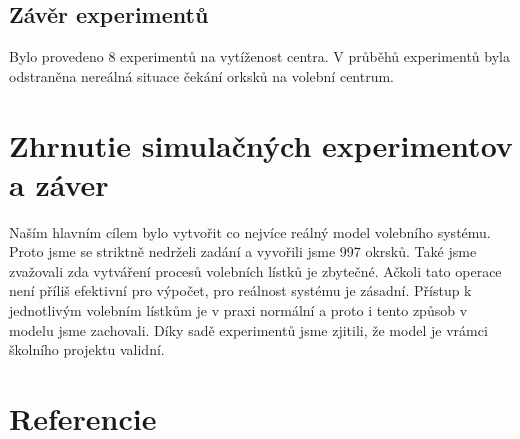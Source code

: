 \documentclass[12pt,a4paper,titlepage,final]{article}
\begin{document}
\newline
\newline
\newpage
\subsection{Závěr experimentů}
Bylo provedeno 8 experimentů na vytíženost centra. V průběhů experimentů byla odstraněna nereálná situace čekání orksků na volební centrum.


\section{Zhrnutie simulačných experimentov a záver}
Naším hlavním cílem bylo vytvořit co nejvíce reálný model volebního systému. Proto jsme se striktně nedrželi zadání a vyvořili jsme 997 okrsků. Také jsme zvažovali zda vytváření procesů volebních lístků je zbytečné. Ačkoli tato operace není příliš efektivní pro výpočet, pro reálnost systému je zásadní. Přístup k jednotlivým volebním lístkům je v praxi normální a proto i tento způsob v modelu jsme zachovali.\newline
Díky sadě experimentů jsme zjitili, že model je vrámci školního projektu validní.


\newpage

\section{Referencie}





\newpage
\end{document}
